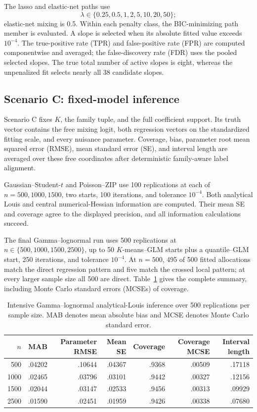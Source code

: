 \documentclass[a4paper,fleqn]{cas-sc}
\numberwithin{equation}{section}
\begin{document}
The lasso and elastic-net paths use
\[
 \lambda\in\{0.25,0.5,1,2,5,10,20,50\};
\]
elastic-net mixing is 0.5. Within each penalty class, the BIC-minimizing path member is evaluated. A slope is selected when its absolute fitted value exceeds $10^{-4}$. The true-positive rate (TPR) and false-positive rate (FPR) are computed componentwise and averaged; the false-discovery rate (FDR) uses the pooled selected slopes. The true total number of active slopes is eight, whereas the unpenalized fit selects nearly all 38 candidate slopes.

\subsection{Scenario C: fixed-model inference}

Scenario C fixes $K$, the family tuple, and the full coefficient support. Its truth vector contains the free mixing logit, both regression vectors on the standardized fitting scale, and every nuisance parameter. Coverage, bias, parameter root mean squared error (RMSE), mean standard error (SE), and interval length are averaged over these free coordinates after deterministic family-aware label alignment.

Gaussian--Student-$t$ and Poisson--ZIP use 100 replications at each of $n=500,1000,1500$, two starts, 100 iterations, and tolerance $10^{-4}$. Both analytical Louis and central numerical-Hessian information are computed. Their mean SE and coverage agree to the displayed precision, and all information calculations succeed.

The final Gamma--lognormal run uses 500 replications at
$n\in\{500,1000,1500,2500\}$, up to 50 $K$-means--GLM starts plus a quantile--GLM start, 250 iterations, and tolerance $10^{-4}$. At $n=500$, 495 of 500 fitted allocations match the direct regression pattern and five match the crossed local pattern; at every larger sample size all 500 are direct. Table~\ref{supp:tab:gamma-inference} gives the complete summary, including Monte Carlo standard errors (MCSEs) of coverage.

\begin{table}[t]
\centering
\caption{Intensive Gamma--lognormal analytical-Louis inference over 500 replications per sample size. MAB denotes mean absolute bias and MCSE denotes Monte Carlo standard error.}
\label{supp:tab:gamma-inference}
\small
\begin{tabular}{rrrrrrr}
\toprule
$n$ & MAB & Parameter RMSE & Mean SE & Coverage & Coverage MCSE & Interval length\\
\midrule
500  & .04202 & .10644 & .04367 & .9368 & .00509 & .17118\\
1000 & .02465 & .03796 & .03101 & .9442 & .00327 & .12156\\
1500 & .02044 & .03147 & .02533 & .9456 & .00313 & .09929\\
2500 & .01590 & .02451 & .01959 & .9426 & .00338 & .07680\\
\bottomrule
\end{tabular}
\end{table}
\end{document}
